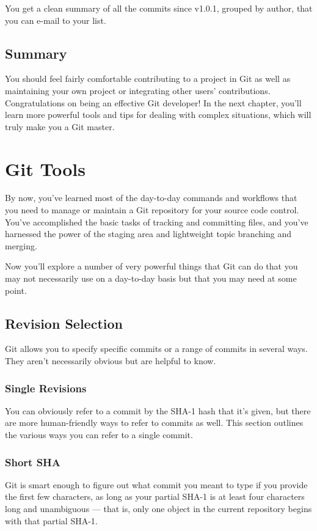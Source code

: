 \documentclass[a4paper]{book}
\newcounter{tab}[chapter]
\newcommand{\chap}[1]{\newpage\thispagestyle{empty}\chapter{#1}\label{chap:\thechapter}}
\begin{document}
You get a clean summary of all the commits since v1.0.1, grouped by author, that you can e-mail to your list.

\section{Summary}

You should feel fairly comfortable contributing to a project in Git as well as maintaining your own project or integrating other users' contributions. Congratulations on being an effective Git developer! In the next chapter, you'll learn more powerful tools and tips for dealing with complex situations, which will truly make you a Git master.

\chap{Git Tools}

By now, you've learned most of the day-to-day commands and workflows that you need to manage or maintain a Git repository for your source code control. You've accomplished the basic tasks of tracking and committing files, and you've harnessed the power of the staging area and lightweight topic branching and merging.

Now you'll explore a number of very powerful things that Git can do that you may not necessarily use on a day-to-day basis but that you may need at some point.

\section{Revision Selection}

Git allows you to specify specific commits or a range of commits in several ways. They aren't necessarily obvious but are helpful to know.

\subsection{Single Revisions}

You can obviously refer to a commit by the SHA-1 hash that it's given, but there are more human-friendly ways to refer to commits as well. This section outlines the various ways you can refer to a single commit.

\subsection{Short SHA}

Git is smart enough to figure out what commit you meant to type if you provide the first few characters, as long as your partial SHA-1 is at least four characters long and unambiguous --- that is, only one object in the current repository begins with that partial SHA-1.
\end{document}
